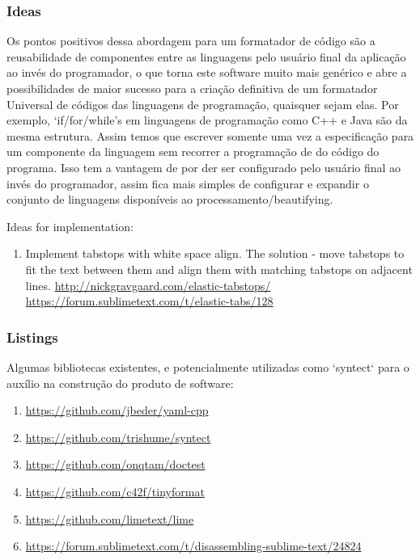 \begin{englishtext}
\subsubsection{Ideas}

    Os pontos positivos dessa abordagem para um formatador de código são a reusabilidade de
    componentes entre as linguagens pelo usuário final da aplicação ao invés do programador, o que
    torna este software muito mais genérico e abre a possibilidades de maior sucesso para a criação
    definitiva de um formatador Universal de códigos das linguagens de programação, quaisquer sejam
    elas. Por exemplo, `if/for/while'\textquotesingle s em linguagens de programação como C++ e Java
    são da mesma estrutura. Assim temos que escrever somente uma vez a especificação para um
    componente da linguagem sem recorrer a programação de do código do programa. Isso tem a vantagem
    de por der ser configurado pelo usuário final ao invés do programador, assim fica mais simples
    de configurar e expandir o conjunto de linguagens disponíveis ao processamento/beautifying.

    Ideas for implementation:

\medskip
\begin{bluebox}
\begin{enumerate}[leftmargin=*]

    \item Implement tabstops with white space align. The solution - move
    tabstops to fit the text between them and align them with matching tabstops
    on adjacent lines. \url{http://nickgravgaard.com/elastic-tabstops/}
    \url{https://forum.sublimetext.com/t/elastic-tabs/128}

\end{enumerate}
\end{bluebox}


\subsubsection{Listings}

    Algumas bibliotecas existentes, e potencialmente utilizadas como `syntect` para o auxílio na
    construção do produto de software:

    \begin{bluebox}
    \begin{enumerate}[leftmargin=*,parsep=0pt]

        \item \url{https://github.com/jbeder/yaml-cpp}
        \item \url{https://github.com/trishume/syntect}
        \item \url{https://github.com/onqtam/doctest}
        \item \url{https://github.com/c42f/tinyformat}
        \item \url{https://github.com/limetext/lime}
        \item \url{https://forum.sublimetext.com/t/disassembling-sublime-text/24824}


\end{enumerate}
\end{bluebox}
\end{englishtext}
